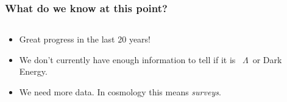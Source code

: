 \documentclass{beamer}
\newcommand{\glambda}{\mbox{{\color{brightred} $\Lambda$}}}
\newcommand{\gdarkenergy}{{\color{cadetblue} Dark Energy}}
\begin{document}
\frame
{
    \frametitle{What do we know at this point?}


    \begin{columns}
        \begin{column}{0.5\textwidth}    
            \begin{itemize}

                \item Great progress in the last 20 years!

                \item We don't currently have enough information to tell if
                    it is \glambda\ or \gdarkenergy.

                \item We need more data.  In cosmology this means {\it surveys}.


\end{itemize}
\end{column}
\end{columns}}
\end{document}
